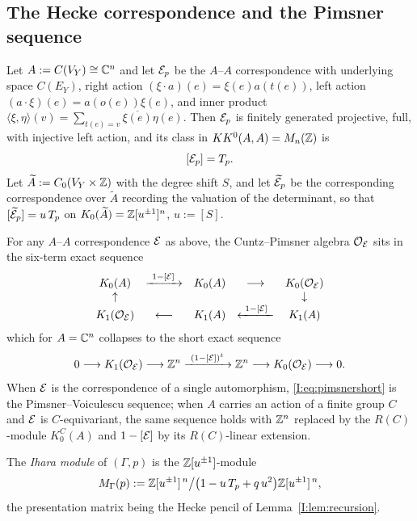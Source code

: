 \subsection{The Hecke correspondence and the Pimsner sequence}

\begin{definition}\label{I:def:corr}
Let $A:=C(V_Y)\cong\mathbb{C}^n$ and let $\mathcal{E}_p$ be the $A$--$A$ correspondence with underlying
space $C(E_Y)$, right action $(\xi\cdot a)(e)=\xi(e)a(t(e))$, left action
$(a\cdot\xi)(e)=a(o(e))\xi(e)$, and inner product
$\langle\xi,\eta\rangle(v)=\sum_{t(e)=v}\overline{\xi(e)}\eta(e)$. Then $\mathcal{E}_p$ is
finitely generated projective, full, with injective left action, and its class in
$KK^0(A,A)=M_n(\mathbb{Z})$ is
\[
[\mathcal{E}_p]=T_p .
\]
Let $\widetilde A:=C_0(V_Y\times\mathbb{Z})$ with the degree shift $S$, and let
$\widetilde{\mathcal{E}}_p$ be the corresponding correspondence over $\widetilde A$ recording the
valuation of the determinant, so that
$[\widetilde{\mathcal{E}}_p]=u\,T_p$ on $K_0(\widetilde A)=\mathbb{Z}[u^{\pm1}]^n$, $u:=[S]$.
\end{definition}

\begin{theorem}\label{I:thm:pimsner}
For any $A$--$A$ correspondence $\mathcal{E}$ as above, the Cuntz--Pimsner algebra $\mathcal{O}_{\mathcal{E}}$ sits
in the six-term exact sequence
\[
\begin{array}{ccccc}
K_0(A)&\xrightarrow{\ 1-[\cE]\ }&K_0(A)&\longrightarrow&K_0(\cO_\cE)\\
\uparrow& & & &\downarrow\\
K_1(\cO_\cE)&\longleftarrow&K_1(A)&\xleftarrow{\ 1-[\cE]\ }&K_1(A)
\end{array}
\]
which for $A=\mathbb{C}^n$ collapses to the short exact sequence
\begin{equation}\label{I:eq:pimsnershort}
0\longrightarrow K_1(\mathcal{O}_{\mathcal{E}})\longrightarrow\mathbb{Z}^n
\xrightarrow{\ (1-[\mathcal{E}])^{t}\ }\mathbb{Z}^n\longrightarrow K_0(\mathcal{O}_{\mathcal{E}})\longrightarrow0 .
\end{equation}
When $\mathcal{E}$ is the correspondence of a single automorphism, \eqref{I:eq:pimsnershort} is the
Pimsner--Voiculescu sequence; when $A$ carries an action of a finite group $C$ and $\mathcal{E}$
is $C$-equivariant, the same sequence holds with $\mathbb{Z}^n$ replaced by the
$R(C)$-module $K_0^C(A)$ and $1-[\mathcal{E}]$ by its $R(C)$-linear extension.
\end{theorem}

\begin{definition}\label{I:def:ihara}
The \emph{Ihara module} of $(\Gamma,p)$ is the $\mathbb{Z}[u^{\pm1}]$-module
\[
M_\Gamma(p):=\mathbb{Z}[u^{\pm1}]^{\,n}\big/\bigl(1-u\,T_p+q\,u^2\bigr)\mathbb{Z}[u^{\pm1}]^{\,n},
\]
the presentation matrix being the Hecke pencil of Lemma~\ref{I:lem:recursion}.
\end{definition}

